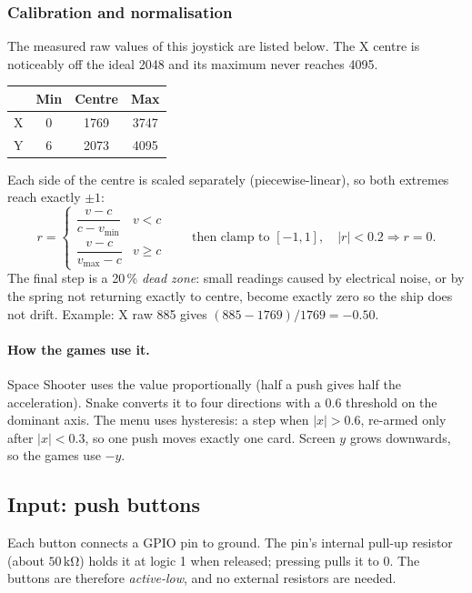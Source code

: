 \documentclass[11pt,a4paper]{article}
\newcommand{\unit}[2]{\ensuremath{#1\,\mathrm{#2}}}
\begin{document}
\subsubsection{Calibration and normalisation}
The measured raw values of this joystick are listed below. The X centre is
noticeably off the ideal 2048 and its maximum never reaches 4095.

\begin{center}
\begin{tabular}{lccc}
\toprule
& \textbf{Min} & \textbf{Centre} & \textbf{Max} \\
\midrule
X & 0 & 1769 & 3747 \\
Y & 6 & 2073 & 4095 \\
\bottomrule
\end{tabular}
\end{center}

\noindent Each side of the centre is scaled separately (piecewise-linear), so
both extremes reach exactly $\pm1$:
\[
  r = \begin{cases}
    \dfrac{v - c}{c - v_{\min}} & v < c \\[2ex]
    \dfrac{v - c}{v_{\max} - c} & v \ge c
  \end{cases}
  \qquad\text{then clamp to } [-1, 1],\quad |r| < 0.2 \Rightarrow r = 0.
\]
The final step is a 20\,\% \emph{dead zone}: small readings caused by electrical
noise, or by the spring not returning exactly to centre, become exactly zero so
the ship does not drift. Example: X raw 885 gives $(885-1769)/1769 = -0.50$.

\paragraph{How the games use it.} Space Shooter uses the value proportionally
(half a push gives half the acceleration). Snake converts it to four directions
with a 0.6 threshold on the dominant axis. The menu uses hysteresis: a step
when $|x| > 0.6$, re-armed only after $|x| < 0.3$, so one push moves exactly one
card. Screen $y$ grows downwards, so the games use $-y$.

\subsection{Input: push buttons}\label{sec:buttons}
Each button connects a GPIO pin to ground. The pin's internal pull-up resistor
(about \unit{50}{k\Omega}) holds it at logic 1 when released; pressing pulls it
to 0. The buttons are therefore \emph{active-low}, and no external resistors are
needed.
\end{document}
